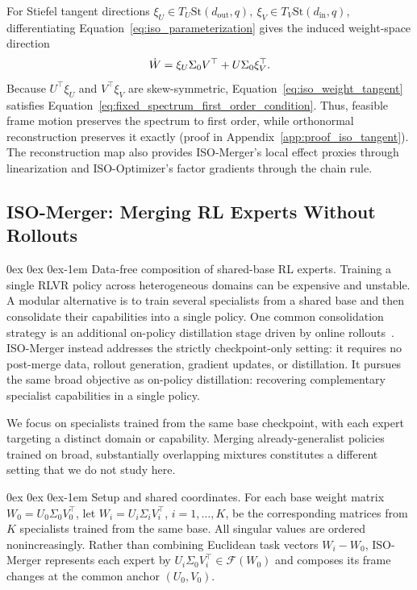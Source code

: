 \documentclass[11pt, a4paper]{utda}
\makeatletter
\renewcommand{\paragraph}{%
  \@startsection{paragraph}{4}%
  {\z@}{0ex \@plus 0ex \@minus 0ex}{-1em}%
  {\normalfont\normalsize\bfseries}%
}
\theoremstyle{plain}
\theoremstyle{definition}
\theoremstyle{remark}
\makeatother
\begin{document}
For Stiefel tangent directions
    $\xi_U
    \in
    T_U\mathrm{St}(d_{\mathrm{out}},q),
    \
    \xi_V
    \in
    T_V\mathrm{St}(d_{\mathrm{in}},q)$,
differentiating Equation~\ref{eq:iso_parameterization} gives the induced
weight-space direction
\begin{equation}
\label{eq:iso_weight_tangent}
\small
    \dot W
    =
    \xi_U\Sigma_0V^\top
    +
    U\Sigma_0\xi_V^\top.
\end{equation}
Because
$U^\top\xi_U$
and
$V^\top\xi_V$
are skew-symmetric,
Equation~\ref{eq:iso_weight_tangent} satisfies
Equation~\ref{eq:fixed_spectrum_first_order_condition}.
Thus, feasible frame motion preserves the spectrum to first
order, while orthonormal reconstruction preserves it exactly
(proof in Appendix~\ref{app:proof_iso_tangent}).
The reconstruction map also provides ISO-Merger's local effect
proxies through linearization and ISO-Optimizer's factor
gradients through the chain rule.


\subsection{ISO-Merger: Merging RL Experts Without Rollouts}
\label{sec:iso_merger}
\paragraph{Data-free composition of shared-base RL experts.}
Training a single RLVR policy across heterogeneous domains can be expensive
and unstable. A modular alternative is to train several specialists from a
shared base and then consolidate their capabilities into a single policy.
One common consolidation strategy is an additional on-policy distillation
stage driven by online rollouts~\cite{lu2025onpolicydistillation,zeng2026glm}.
ISO-Merger instead addresses the strictly checkpoint-only setting: it requires
no post-merge data, rollout generation, gradient updates, or distillation. It
pursues the same broad objective as on-policy distillation: recovering
complementary specialist capabilities in a single policy.

We focus on specialists trained from the same base checkpoint, with each
expert targeting a distinct domain or capability. Merging already-generalist
policies trained on broad, substantially overlapping mixtures constitutes a
different setting that we do not study here.


\paragraph{Setup and shared coordinates.}
For each base weight matrix $W_0=U_0\Sigma_0V_0^\top$, let
$W_i=U_i\Sigma_iV_i^\top$, $i=1,\ldots,K$, be the corresponding
matrices from $K$ specialists trained from the same base.
All singular values are ordered nonincreasingly.
Rather than combining Euclidean task vectors $W_i-W_0$,
ISO-Merger represents each expert by
$U_i\Sigma_0V_i^\top\in\mathcal F(W_0)$ and composes its
frame changes at the common anchor $(U_0,V_0)$.
\end{document}
